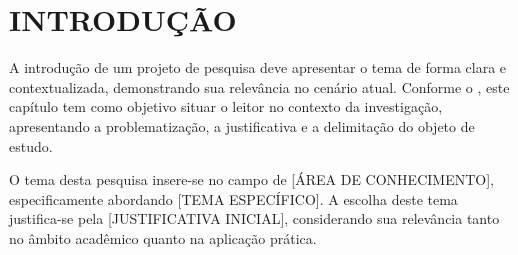 





\frenchspacing




\chapter{INTRODUÇÃO}
\label{chap:introducao}

A introdução de um projeto de pesquisa deve apresentar o tema de forma clara e contextualizada, demonstrando sua relevância no cenário atual. Conforme o , este capítulo tem como objetivo situar o leitor no contexto da investigação, apresentando a problematização, a justificativa e a delimitação do objeto de estudo.

O tema desta pesquisa insere-se no campo de [ÁREA DE CONHECIMENTO], especificamente abordando [TEMA ESPECÍFICO]. A escolha deste tema justifica-se pela [JUSTIFICATIVA INICIAL], considerando sua relevância tanto no âmbito acadêmico quanto na aplicação prática.


